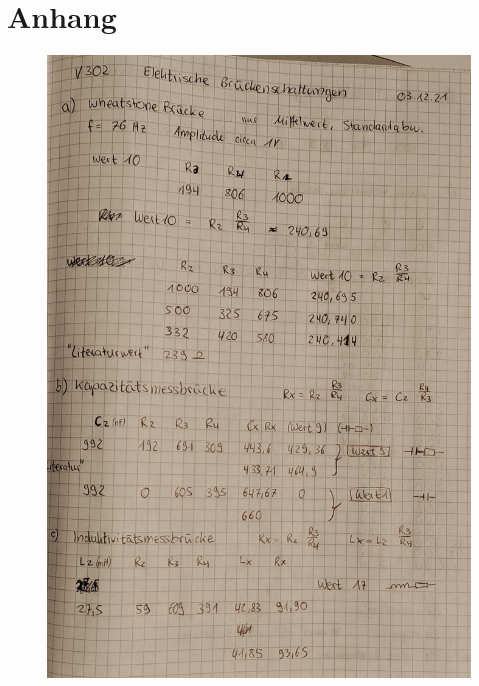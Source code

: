 \section{Anhang}
\begin{figure}[H]
    \centering
     \includegraphics[scale=0.3]{Abbildungen/Kladde1.jpeg}
 \end{figure}

